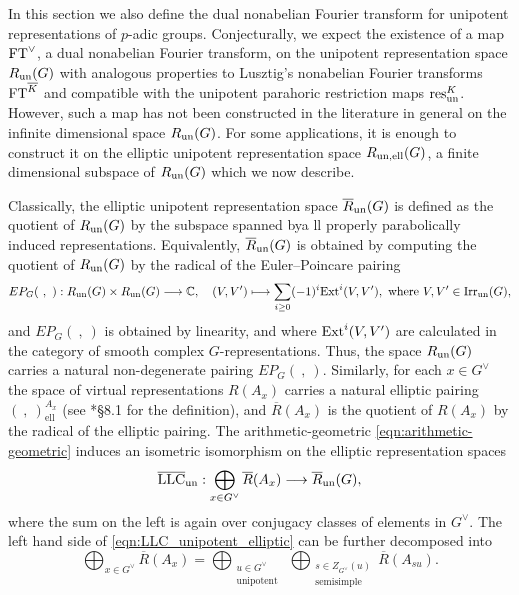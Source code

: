 In this section we also define the dual nonabelian Fourier transform for unipotent representations of $p$-adic groups. Conjecturally, we expect the existence of a map $\mathrm{FT}^\vee$, a dual nonabelian Fourier transform, on the unipotent representation space $R_{\mathrm{un}}(G)$ with analogous properties to Lusztig's nonabelian Fourier transforms $\mathrm{FT}^{\overline{K}}$ and compatible with the unipotent parahoric restriction maps $\mathrm{res}_{\mathrm{un}}^K$. However, such a map has not been constructed in the literature in general on the infinite dimensional space $R_{\mathrm{un}}(G)$. For some applications, it is enough to construct it on the elliptic unipotent representation space $R_{\mathrm{un},\mathrm{ell}}(G)$, a finite dimensional subspace of $R_{\mathrm{un}}(G)$ which we now describe. 

Classically, the elliptic unipotent representation space $\overline{R}_{\mathrm{un}}(G)$ is defined as the quotient of $R_{\mathrm{un}}(G)$ by the subspace spanned bya ll properly parabolically induced representations. Equivalently, $\overline{R}_{\mathrm{un}}(G)$ is obtained by computing the quotient of $R_{\mathrm{un}}(G)$ by the radical of the Euler--Poincare pairing
\begin{equation*}
    EP_G(\ ,\ ):R_{\un}(G)\times R_{\un}(G)\longrightarrow\CC,\quad (V,V')\longmapsto\sum_{i\geq0}(-1)^i\Ext^i(V,V'),\text{ where }V,V'\in\Irr_{\un}(G),
\end{equation*}
and $EP_G(\ ,\ )$ is obtained by linearity, and where $\mathrm{Ext}^i(V,V')$ are calculated in the category of smooth complex $G$-representations. Thus, the space $R_{\mathrm{un}}(G)$ carries a natural non-degenerate pairing $EP_G(\ ,\ )$. Similarly, for each $x\in G^\vee$ the space of virtual representations $R(A_x)$ carries a natural elliptic pairing $(\ ,\ )^{A_x}_{\mathrm{ell}}$ (see \cite{AubertCiubotaruRomano2024}*{\S8.1} for the definition), and $\overline{R}(A_x)$ is the quotient of $R(A_x)$ by the radical of the elliptic pairing. The arithmetic-geometric \eqref{eqn:arithmetic-geometric} induces an isometric isomorphism on the elliptic representation spaces
\begin{equation}\label{eqn:LLC_unipotent_elliptic}
    \overline{\mathrm{LLC}}_{\mathrm{un}}:\bigoplus_{x\in G^\vee}\overline{R}(A_x)\longrightarrow\overline{R}_{\mathrm{un}}(G),
\end{equation}
where the sum on the left is again over conjugacy classes of elements in $G^\vee$. The left hand side of \eqref{eqn:LLC_unipotent_elliptic} can be further decomposed into
$$\bigoplus_{x\in G^\vee}\overline{R}(A_x)=\bigoplus_{\substack{u\in G^\vee\\\mathrm{unipotent}}}\ \bigoplus_{\substack{s\in Z_{G^\vee}(u)\\\mathrm{semisimple}}}\overline{R}(A_{su}).$$
